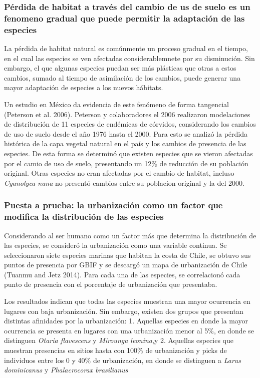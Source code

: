 \documentclass[]{article}
\begin{document}
\subsubsection{Pérdida de habitat a través del cambio de us de suelo es
un fenomeno gradual que puede permitir la adaptación de las
especies}\label{perdida-de-habitat-a-traves-del-cambio-de-us-de-suelo-es-un-fenomeno-gradual-que-puede-permitir-la-adaptacion-de-las-especies}

La pérdida de habitat natural es comúnmente un proceso gradual en el
tiempo, en el cual las especies se ven afectadas considerablemnete por
su disminución. Sin embargo, el que algunas especies puedan ser más
plásticas que otras a estos cambios, sumado al tiempo de asimilación de
los cambios, puede generar una mayor adaptación de especies a los nuevos
hábitats.

Un estudio en México da evidencia de este fenómeno de forma tangencial
(Peterson et al. 2006). Peterson y colaboradores el 2006 realizaron
modelaciones de distribución de 11 especies de endémicas de córvidos,
considerando los cambios de uso de suelo desde el año 1976 hasta el
2000. Para esto se analizó la pérdida histórica de la capa vegetal
natural en el país y los cambios de presencia de las especies. De esta
forma se determinó que existen especies que se vieron afectadas por el
camio de uso de suelo, presentando un 12\% de reducción de su población
original. Otras especies no eran afectadas por el cambio de habitat,
incluso \emph{Cyanolyca nana} no presentó cambios entre su poblacion
original y la del 2000.

\subsubsection{Puesta a prueba: la urbanización como un factor que
modifica la distribución de las
especies}\label{puesta-a-prueba-la-urbanizacion-como-un-factor-que-modifica-la-distribucion-de-las-especies}

Considerando al ser humano como un factor más que determina la
distribución de las especies, se consideró la urbanización como una
variable continua. Se seleccionaron siete especies marinas que habitan
la costa de Chile, se obtuvo sus puntos de presencia por GBIF y se
descargó un mapa de urbanización de Chile (Tuanmu and Jetz 2014). Para
cada una de las especies, se correlacionó cada punto de presencia con el
porcentaje de urbanización que presentaba.

Los resultados indican que todas las especies muestran una mayor
ocurrencia en lugares con baja urbanización. Sin embargo, existen dos
grupos que presentan distintas afinidades por la urbanización: 1.
Aquellas especies en donde la mayor ocurrencia se presenta en lugares
con una urbanización menor al 5\%, en donde se distinguen \emph{Otaria
flavescens} y \emph{Mirounga leonina},y 2. Aquellas especies que
muestran presencias en sitios hasta con 100\% de urbanización y picks de
individuos entre los 0 y 40\% de urbanización, en donde se distinguen a
\emph{Larus dominicanus} y \emph{Phalacrocorax brasilianus}
\end{document}
